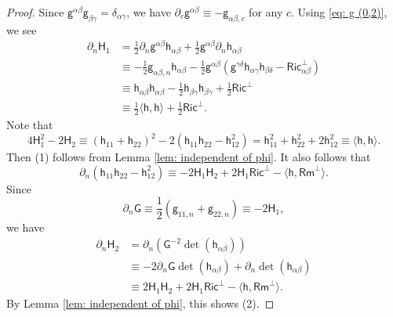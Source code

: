 \documentclass[11pt]{amsart}
\theoremstyle{definition}
\numberwithin{equation}{section}
\begin{document}
\begin{proof}
    Since $\mathsf g^{\alpha\beta}\mathsf g_{\beta\gamma} = \delta_{\alpha\gamma}$, we have $\partial_c\mathsf g^{\alpha\beta} \equiv -\mathsf g_{\alpha\beta,c}$ for any $c$. Using \eqref{eq: g (0,2)}, we see
    \begin{align*}
        \partial_n\mathsf H_1
        & = \frac{1}{2}\partial_n\mathsf g^{\alpha\beta}\mathsf h_{\alpha\beta} + \frac{1}{2}\mathsf g^{\alpha\beta}\partial_n\mathsf h_{\alpha\beta}\\
        & \equiv -\frac{1}{2}\mathsf g_{\alpha\beta,n}\mathsf h_{\alpha\beta} - \frac{1}{2}\mathsf g^{\alpha\beta}(\mathsf g^{\gamma\delta}\mathsf h_{\alpha\gamma}\mathsf h_{\beta\delta} - \mathsf{Ric}_{\alpha\beta}^\bot)\\
        & \equiv \mathsf h_{\alpha\beta}\mathsf h_{\alpha\beta} - \frac{1}{2}\mathsf h_{\beta\gamma}\mathsf h_{\beta\gamma} +  \frac{1}{2}\mathsf{Ric}^\bot\\
        & \equiv \frac{1}{2}\langle\mathsf h,\mathsf h\rangle + \frac{1}{2}\mathsf{Ric}^\bot.
    \end{align*}
    Note that 
    \[4\mathsf H_1^2-2\mathsf H_2\equiv(\mathsf h_{11} + \mathsf h_{22})^2 - 2(\mathsf h_{11}\mathsf h_{22} - \mathsf h_{12}^2) = \mathsf h_{11}^2 + \mathsf h_{22}^2 + 2\mathsf h_{12}^2\equiv\langle\mathsf h,\mathsf h\rangle.\]
    Then (1) follows from Lemma \ref{lem: independent of phi}. It also follows that
    \[\partial_n(\mathsf h_{11}\mathsf h_{22} - \mathsf h_{12}^2) \equiv - 2\mathsf H_1\mathsf H_2 + 2\mathsf H_1\mathsf{Ric}^\bot - \langle\mathsf h,\mathsf{Rm}^\bot\rangle.\]
    Since
    \[\partial_n\mathsf G \equiv \frac{1}{2}(\mathsf g_{11,n} + \mathsf g_{22,n}) \equiv - 2\mathsf H_1,\]
    we have
    \begin{align*}
        \partial_n\mathsf H_2
        & = \partial_n(\mathsf G^{ - 2}\det(\mathsf h_{\alpha\beta}))\\
        & \equiv - 2\partial_n\mathsf G\det(\mathsf h_{\alpha\beta}) + \partial_n\det(\mathsf h_{\alpha\beta})\\
        & \equiv 2\mathsf H_1\mathsf H_2 + 2\mathsf H_1\mathsf{Ric}^\bot - \langle\mathsf h, \mathsf{Rm}^\bot\rangle.
    \end{align*}
    By Lemma \ref{lem: independent of phi}, this shows (2).


\end{proof}
\end{document}

